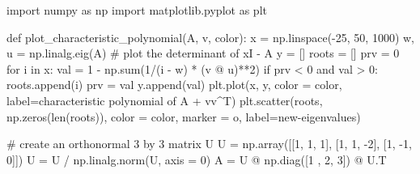 \documentclass[
  letterpaper,
  DIV=11,
  numbers=noendperiod]{scrartcl}
\newenvironment{Shaded}{\begin{snugshade}}{\end{snugshade}}
\newcommand{\BuiltInTok}[1]{\textcolor[rgb]{0.00,0.23,0.31}{#1}}
\newcommand{\CommentTok}[1]{\textcolor[rgb]{0.37,0.37,0.37}{#1}}
\newcommand{\ControlFlowTok}[1]{\textcolor[rgb]{0.00,0.23,0.31}{#1}}
\newcommand{\DecValTok}[1]{\textcolor[rgb]{0.68,0.00,0.00}{#1}}
\newcommand{\ImportTok}[1]{\textcolor[rgb]{0.00,0.46,0.62}{#1}}
\newcommand{\KeywordTok}[1]{\textcolor[rgb]{0.00,0.23,0.31}{#1}}
\newcommand{\NormalTok}[1]{\textcolor[rgb]{0.00,0.23,0.31}{#1}}
\newcommand{\OperatorTok}[1]{\textcolor[rgb]{0.37,0.37,0.37}{#1}}
\newcommand{\StringTok}[1]{\textcolor[rgb]{0.13,0.47,0.30}{#1}}
\theoremstyle{plain}
\theoremstyle{plain}
\theoremstyle{plain}
\theoremstyle{definition}
\theoremstyle{remark}
\begin{document}
\begin{Shaded}
\begin{Highlighting}[]
\ImportTok{import}\NormalTok{ numpy }\ImportTok{as}\NormalTok{ np}
\ImportTok{import}\NormalTok{ matplotlib.pyplot }\ImportTok{as}\NormalTok{ plt}

\KeywordTok{def}\NormalTok{ plot\_characteristic\_polynomial(A, v, color):}
\NormalTok{  x }\OperatorTok{=}\NormalTok{ np.linspace(}\OperatorTok{{-}}\DecValTok{25}\NormalTok{, }\DecValTok{50}\NormalTok{, }\DecValTok{1000}\NormalTok{)}
\NormalTok{  w, u }\OperatorTok{=}\NormalTok{ np.linalg.eig(A)}
  \CommentTok{\# plot the determinant of xI {-} A}
\NormalTok{  y }\OperatorTok{=}\NormalTok{ []}
\NormalTok{  roots }\OperatorTok{=}\NormalTok{ []}
\NormalTok{  prv }\OperatorTok{=} \DecValTok{0}
  \ControlFlowTok{for}\NormalTok{ i }\KeywordTok{in}\NormalTok{ x:}
\NormalTok{    val }\OperatorTok{=} \DecValTok{1} \OperatorTok{{-}}\NormalTok{ np.}\BuiltInTok{sum}\NormalTok{(}\DecValTok{1}\OperatorTok{/}\NormalTok{(i }\OperatorTok{{-}}\NormalTok{ w) }\OperatorTok{*}\NormalTok{ (v }\OperatorTok{@}\NormalTok{ u)}\OperatorTok{**}\DecValTok{2}\NormalTok{)}
    \ControlFlowTok{if}\NormalTok{ prv }\OperatorTok{\textless{}} \DecValTok{0} \KeywordTok{and}\NormalTok{ val }\OperatorTok{\textgreater{}} \DecValTok{0}\NormalTok{:}
\NormalTok{      roots.append(i)}
\NormalTok{    prv }\OperatorTok{=}\NormalTok{ val}
\NormalTok{    y.append(val)}
\NormalTok{  plt.plot(x, y, color }\OperatorTok{=}\NormalTok{ color, label}\OperatorTok{=}\StringTok{\textquotesingle{}characteristic polynomial of A + vv\^{}T\textquotesingle{}}\NormalTok{)}
\NormalTok{  plt.scatter(roots, np.zeros(}\BuiltInTok{len}\NormalTok{(roots)), color }\OperatorTok{=}\NormalTok{ color, marker }\OperatorTok{=} \StringTok{\textquotesingle{}o\textquotesingle{}}\NormalTok{, label}\OperatorTok{=}\StringTok{\textquotesingle{}new{-}eigenvalues\textquotesingle{}}\NormalTok{)}

\CommentTok{\# create an orthonormal 3 by 3 matrix U}
\NormalTok{U }\OperatorTok{=}\NormalTok{ np.array([[}\DecValTok{1}\NormalTok{, }\DecValTok{1}\NormalTok{, }\DecValTok{1}\NormalTok{], [}\DecValTok{1}\NormalTok{, }\DecValTok{1}\NormalTok{, }\OperatorTok{{-}}\DecValTok{2}\NormalTok{], [}\DecValTok{1}\NormalTok{, }\OperatorTok{{-}}\DecValTok{1}\NormalTok{, }\DecValTok{0}\NormalTok{]])}
\NormalTok{U }\OperatorTok{=}\NormalTok{ U }\OperatorTok{/}\NormalTok{ np.linalg.norm(U, axis }\OperatorTok{=} \DecValTok{0}\NormalTok{)}
\NormalTok{A }\OperatorTok{=}\NormalTok{ U }\OperatorTok{@}\NormalTok{ np.diag([}\DecValTok{1}\NormalTok{ , }\DecValTok{2}\NormalTok{, }\DecValTok{3}\NormalTok{]) }\OperatorTok{@}\NormalTok{ U.T}




\end{Highlighting}
\end{Shaded}
\end{document}
